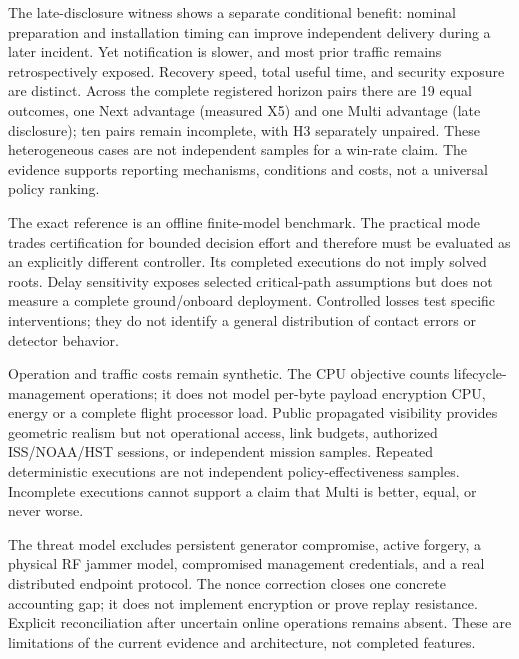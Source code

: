 \documentclass[conference]{IEEEtran}
\begin{document}
The late-disclosure witness shows a separate conditional benefit: nominal preparation and installation timing can improve independent delivery during a later incident. Yet notification is slower, and most prior traffic remains retrospectively exposed. Recovery speed, total useful time, and security exposure are distinct. Across the complete registered horizon pairs there are 19 equal outcomes, one Next advantage (measured X5) and one Multi advantage (late disclosure); ten pairs remain incomplete, with H3 separately unpaired. These heterogeneous cases are not independent samples for a win-rate claim. The evidence supports reporting mechanisms, conditions and costs, not a universal policy ranking.

The exact reference is an offline finite-model benchmark. The practical mode trades certification for bounded decision effort and therefore must be evaluated as an explicitly different controller. Its completed executions do not imply solved roots. Delay sensitivity exposes selected critical-path assumptions but does not measure a complete ground/onboard deployment. Controlled losses test specific interventions; they do not identify a general distribution of contact errors or detector behavior.

Operation and traffic costs remain synthetic. The CPU objective counts lifecycle-management operations; it does not model per-byte payload encryption CPU, energy or a complete flight processor load. Public propagated visibility provides geometric realism but not operational access, link budgets, authorized ISS/NOAA/HST sessions, or independent mission samples. Repeated deterministic executions are not independent policy-effectiveness samples. Incomplete executions cannot support a claim that Multi is better, equal, or never worse.

The threat model excludes persistent generator compromise, active forgery, a physical RF jammer model, compromised management credentials, and a real distributed endpoint protocol. The nonce correction closes one concrete accounting gap; it does not implement encryption or prove replay resistance. Explicit reconciliation after uncertain online operations remains absent. These are limitations of the current evidence and architecture, not completed features.
\end{document}
